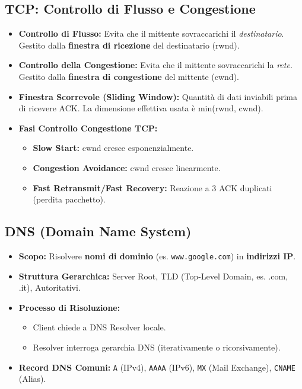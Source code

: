 \subsection{TCP: Controllo di Flusso e Congestione}
\begin{itemize}
    \item \textbf{Controllo di Flusso:} Evita che il mittente sovraccarichi il \textit{destinatario}. Gestito dalla \textbf{finestra di ricezione} del destinatario (rwnd).
    \item \textbf{Controllo della Congestione:} Evita che il mittente sovraccarichi la \textit{rete}. Gestito dalla \textbf{finestra di congestione} del mittente (cwnd).
    \item \textbf{Finestra Scorrevole (Sliding Window):} Quantità di dati inviabili prima di ricevere ACK. La dimensione effettiva usata è min(rwnd, cwnd).
    \item \textbf{Fasi Controllo Congestione TCP:}
        \begin{itemize}
            \item \textbf{Slow Start:} cwnd cresce esponenzialmente.
            \item \textbf{Congestion Avoidance:} cwnd cresce linearmente.
            \item \textbf{Fast Retransmit/Fast Recovery:} Reazione a 3 ACK duplicati (perdita pacchetto).
        \end{itemize}
\end{itemize}

\subsection{DNS (Domain Name System)}
\begin{itemize}
    \item \textbf{Scopo:} Risolvere \textbf{nomi di dominio} (es. \texttt{www.google.com}) in \textbf{indirizzi IP}.
    \item \textbf{Struttura Gerarchica:} Server Root, TLD (Top-Level Domain, es. .com, .it), Autoritativi.
    \item \textbf{Processo di Risoluzione:}
        \begin{itemize}
            \item Client chiede a DNS Resolver locale.
            \item Resolver interroga gerarchia DNS (iterativamente o ricorsivamente).
        \end{itemize}
    \item \textbf{Record DNS Comuni:} \texttt{A} (IPv4), \texttt{AAAA} (IPv6), \texttt{MX} (Mail Exchange), \texttt{CNAME} (Alias).
\end{itemize}

